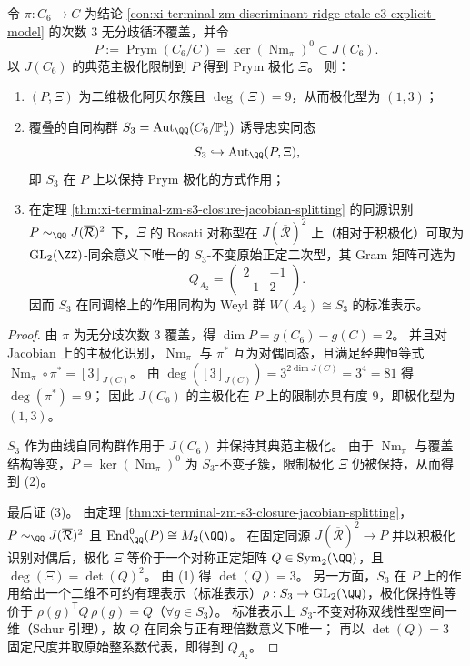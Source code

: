 \begin{theorem}[Prym 极化的 \texorpdfstring{$A_2$}{A2} 根格刚性与 \texorpdfstring{$W(A_2)\cong S_3$}{W(A2)=S3} 的极化保持作用]\label{thm:xi-terminal-zm-prym-polarization-a2-rigidity}
令 \(\pi:C_6\to C\) 为结论 \ref{con:xi-terminal-zm-discriminant-ridge-etale-c3-explicit-model} 的次数 \(3\) 无分歧循环覆盖，并令
\[
P:=\operatorname{Prym}(C_6/C)=\ker(\operatorname{Nm}_\pi)^{0}\subset J(C_6).
\]
以 \(J(C_6)\) 的典范主极化限制到 \(P\) 得到 Prym 极化 \(\Xi\)。
则：
\begin{enumerate}
  \item \((P,\Xi)\) 为二维极化阿贝尔簇且 \(\deg(\Xi)=9\)，从而极化型为 \((1,3)\)；
  \item 覆叠的自同构群 \(S_3=\operatorname{Aut}_{\QQ}(C_6/\mathbb P^1_y)\) 诱导忠实同态
  \[
  S_3\hookrightarrow \operatorname{Aut}_{\QQ}(P,\Xi),
  \]
  即 \(S_3\) 在 \(P\) 上以保持 Prym 极化的方式作用；
  \item 在定理 \ref{thm:xi-terminal-zm-s3-closure-jacobian-splitting} 的同源识别 \(P\sim_{\QQ}J(\overline{\mathcal R})^2\) 下，\(\Xi\) 的 Rosati 对称型在 \(J(\overline{\mathcal R})^2\) 上（相对于积极化）可取为 \(\mathrm{GL}_2(\ZZ)\)-同余意义下唯一的 \(S_3\)-不变原始正定二次型，其 Gram 矩阵可选为
  \[
  Q_{A_2}=\begin{pmatrix}2&-1\\-1&2\end{pmatrix}.
  \]
  因而 \(S_3\) 在同调格上的作用同构为 Weyl 群 \(W(A_2)\cong S_3\) 的标准表示。
\end{enumerate}
\end{theorem}
\begin{proof}
由 \(\pi\) 为无分歧次数 \(3\) 覆盖，得 \(\dim P=g(C_6)-g(C)=2\)。
并且对 Jacobian 上的主极化识别，\(\operatorname{Nm}_\pi\) 与 \(\pi^\ast\) 互为对偶同态，且满足经典恒等式
\(
\operatorname{Nm}_\pi\circ\pi^\ast=[3]_{J(C)}
\)。
由 \(\deg([3]_{J(C)})=3^{2\dim J(C)}=3^4=81\) 得 \(\deg(\pi^\ast)=9\)；
因此 \(J(C_6)\) 的主极化在 \(P\) 上的限制亦具有度 \(9\)，即极化型为 \((1,3)\)。
\par
\(S_3\) 作为曲线自同构群作用于 \(J(C_6)\) 并保持其典范主极化。
由于 \(\operatorname{Nm}_\pi\) 与覆盖结构等变，\(P=\ker(\operatorname{Nm}_\pi)^0\) 为 \(S_3\)-不变子簇，限制极化 \(\Xi\) 仍被保持，从而得到 (2)。
\par
最后证 (3)。
由定理 \ref{thm:xi-terminal-zm-s3-closure-jacobian-splitting}，\(P\sim_{\QQ}J(\overline{\mathcal R})^2\) 且 \(\mathrm{End}^0_{\QQ}(P)\cong M_2(\QQ)\)。
在固定同源 \(J(\overline{\mathcal R})^2\to P\) 并以积极化识别对偶后，极化 \(\Xi\) 等价于一个对称正定矩阵 \(Q\in \mathrm{Sym}_2(\QQ)\)，且 \(\deg(\Xi)=\det(Q)^2\)。
由 (1) 得 \(\det(Q)=3\)。
另一方面，\(S_3\) 在 \(P\) 上的作用给出一个二维不可约有理表示（标准表示）\(\rho:S_3\to \mathrm{GL}_2(\QQ)\)，极化保持性等价于
\(
\rho(g)^{\mathsf T}Q\,\rho(g)=Q
\)（\(\forall g\in S_3\)）。
标准表示上 \(S_3\)-不变对称双线性型空间一维（Schur 引理），故 \(Q\) 在同余与正有理倍数意义下唯一；
再以 \(\det(Q)=3\) 固定尺度并取原始整系数代表，即得到 \(Q_{A_2}\)。
\end{proof}


